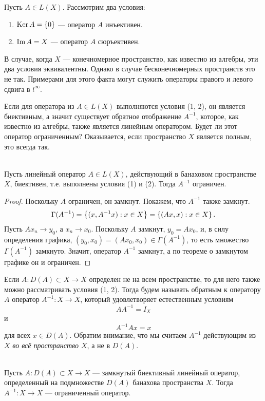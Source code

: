 Пусть $A \in L(X)$. Рассмотрим два условия:
\begin{enumerate}
    \item $\operatorname{Ker} A = \left\{0\right\}$ --- оператор $A$ инъективен.
    \item $\operatorname{Im} A = X$ --- оператор $A$ сюръективен.
\end{enumerate}

В случае, когда $X$ --- конечномерное пространство, как известно из алгебры, эти два условия
эквивалентны. Однако в случае бесконечномерных пространств это не так. Примерами для этого
факта могут служить операторы правого и левого сдвига в $l^\infty$.

Если для оператора из $A \in L(X)$ выполняются условия (1, 2), он является биективным,
а значит существует обратное отображение $A^{-1}$, которое, как известно из алгебры, также
является линейным оператором. Будет ли этот оператор ограниченным? Оказывается, если пространство
$X$ является полным, это всегда так.

\begin{theorem}\hfill\\
    \indent Пусть линейный оператор $A \in L(X)$, действующий в банаховом пространстве $X$, 
    биективен, т.е. выполнены условия (1) и (2). Тогда $A^{-1}$ ограничен.
\end{theorem}

\begin{proof}
    Поскольку $A$ ограничен, он замкнут. Покажем, что $A^{-1}$ также замкнут.
    \[ \Gamma(A^{-1}) = \left\{(x, A^{-1}x) : x \in X\right\} = \left\{(Ax, x) : x \in X\right\}. \]
    Пусть $Ax_n \to y_0$, а $x_n \to x_0$. Поскольку $A$ замкнут, $y_0 = Ax_0$, и, в силу 
    определения графика,
    $(y_0, x_0) = (Ax_0, x_0) \in \Gamma(A^{-1})$, то есть множество $\Gamma(A^{-1})$ замкнуто.
    Значит, оператор $A^{-1}$ замкнут, а по теореме о замкнутом графике он и ограничен.
\end{proof}

Если $A \colon D(A) \subset X \to X$ определен не на всем пространстве, то для него также можно 
рассматривать условия (1, 2). Тогда будем называть обратным к оператору $A$ оператор 
$A^{-1} \colon X \to X$, который удовлетворяет естественным условиям
\[ AA^{-1} = I_X \]
и
\[ A^{-1}Ax = x \]
для всех $x \in D(A)$. 
Обратим внимание, что мы считаем $A^{-1}$ действующим из $X$ \emph{во всё пространство $X$}, 
а не в $D(A)$.

\begin{theorem}\hfill\\
    \indent Пусть $A \colon D(A) \subset X \to X$ --- замкнутый биективный линейный оператор, 
    определенный на подмножестве $D(A)$ банахова пространства $X$. Тогда $A^{-1} \colon X \to X$ 
    --- ограниченный оператор. 
\end{theorem}

